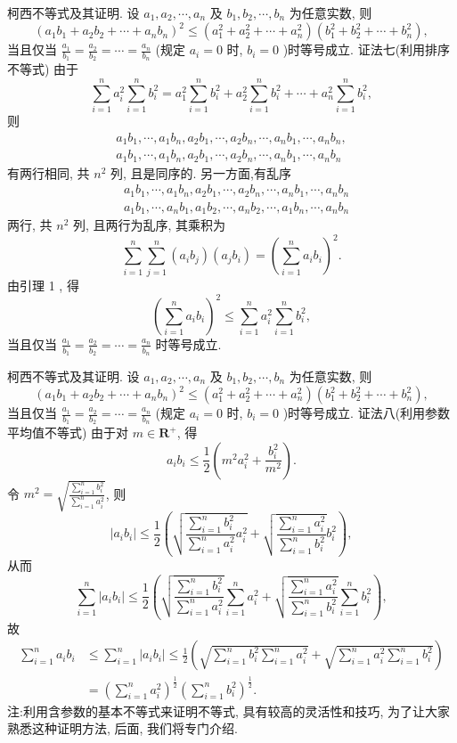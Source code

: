 柯西不等式及其证明.
设 $a_1, a_2, \cdots, a_n$ 及 $b_1, b_2, \cdots, b_n$ 为任意实数, 则
$$
\left(a_1 b_1+a_2 b_2+\cdots+a_n b_n\right)^2 \leqslant\left(a_1^2+a_2^2+\cdots+a_n^2\right)\left(b_1^2+b_2^2+\cdots+b_n^2\right),
$$
当且仅当 $\frac{a_1}{b_1}=\frac{a_2}{b_2}=\cdots=\frac{a_n}{b_n}$ (规定 $a_i=0$ 时, $b_i=0$ )时等号成立.
证法七(利用排序不等式) 由于
$$
\sum_{i=1}^n a_i^2 \sum_{i=1}^n b_i^2=a_1^2 \sum_{i=1}^n b_i^2+a_2^2 \sum_{i=1}^n b_i^2+\cdots+a_n^2 \sum_{i=1}^n b_i^2,
$$
则
$$
\begin{gathered}
a_1 b_1, \cdots, a_1 b_n, a_2 b_1, \cdots, a_2 b_n, \cdots, a_n b_1, \cdots, a_n b_n, \\
a_1 b_1, \cdots, a_1 b_n, a_2 b_1, \cdots, a_2 b_n, \cdots, a_n b_1, \cdots, a_n b_n
\end{gathered}
$$
有两行相同, 共 $n^2$ 列, 且是同序的.
另一方面,有乱序
$$
\begin{aligned}
& a_1 b_1, \cdots, a_1 b_n, a_2 b_1, \cdots, a_2 b_n, \cdots, a_n b_1, \cdots, a_n b_n \\
& a_1 b_1, \cdots, a_n b_1, a_1 b_2, \cdots, a_n b_2, \cdots, a_1 b_n, \cdots, a_n b_n
\end{aligned}
$$
两行, 共 $n^2$ 列, 且两行为乱序, 其乘积为
$$
\sum_{i=1}^n \sum_{j=1}^n\left(a_i b_j\right)\left(a_j b_i\right)=\left(\sum_{i=1}^n a_i b_i\right)^2 .
$$
由引理 1 , 得
$$
\left(\sum_{i=1}^n a_i b_i\right)^2 \leqslant \sum_{i=1}^n a_i^2 \sum_{i=1}^n b_i^2,
$$
当且仅当 $\frac{a_1}{b_1}=\frac{a_2}{b_2}=\cdots=\frac{a_n}{b_n}$ 时等号成立.



柯西不等式及其证明.
设 $a_1, a_2, \cdots, a_n$ 及 $b_1, b_2, \cdots, b_n$ 为任意实数, 则
$$
\left(a_1 b_1+a_2 b_2+\cdots+a_n b_n\right)^2 \leqslant\left(a_1^2+a_2^2+\cdots+a_n^2\right)\left(b_1^2+b_2^2+\cdots+b_n^2\right),
$$
当且仅当 $\frac{a_1}{b_1}=\frac{a_2}{b_2}=\cdots=\frac{a_n}{b_n}$ (规定 $a_i=0$ 时, $b_i=0$ )时等号成立.
证法八(利用参数平均值不等式)
由于对 $m \in \mathbf{R}^{+}$, 得
$$
a_i b_i \leqslant \frac{1}{2}\left(m^2 a_i^2+\frac{b_i^2}{m^2}\right) .
$$
令 $m^2=\sqrt{\frac{\sum_{i=1}^n b_i^2}{\sum_{i=1}^n a_i^2}}$, 则
$$
\left|a_i b_i\right| \leqslant \frac{1}{2}\left(\sqrt{\frac{\sum_{i=1}^n b_i^2}{\sum_{i=1}^n a_i^2} a_i^2}+\sqrt{\frac{\sum_{i=1}^n a_i^2}{\sum_{i=1}^n b_i^2}} b_i^2\right),
$$
从而
$$
\sum_{i=1}^n\left|a_i b_i\right| \leqslant \frac{1}{2}\left(\sqrt{\frac{\sum_{i=1}^n b_i^2}{\sum_{i=1}^n a_i^2}} \sum_{i=1}^n a_i^2+\sqrt{\frac{\sum_{i=1}^n a_i^2}{\sum_{i=1}^n b_i^2}} \sum_{i=1}^n b_i^2\right),
$$
故
$$
\begin{aligned}
\sum_{i=1}^n a_i b_i & \leqslant \sum_{i=1}^n\left|a_i b_i\right| \leqslant \frac{1}{2}\left(\sqrt{\sum_{i=1}^n b_i^2 \sum_{i=1}^n a_i^2}+\sqrt{\sum_{i=1}^n a_i^2 \sum_{i=1}^n b_i^2}\right) \\
& =\left(\sum_{i=1}^n a_i^2\right)^{\frac{1}{2}}\left(\sum_{i=1}^n b_i^2\right)^{\frac{1}{2}} .
\end{aligned}
$$
注:利用含参数的基本不等式来证明不等式, 具有较高的灵活性和技巧, 为了让大家熟悉这种证明方法, 后面, 我们将专门介绍.



